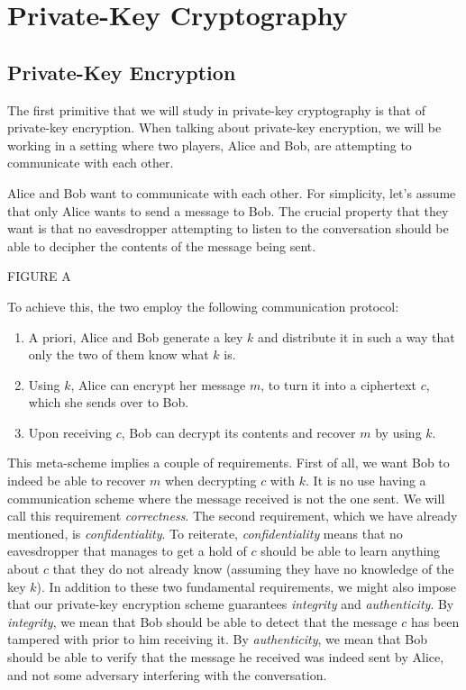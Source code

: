 \chapter{Private-Key Cryptography}
\newcommand{\gen}{\mathsf{Gen}}
\section{Private-Key Encryption}
The first primitive that we will study in private-key cryptography is that of private-key encryption.
When talking about private-key encryption, we will be working in a setting where two players, Alice and Bob, are attempting to communicate with each other.

Alice and Bob want to communicate with each other.
For simplicity, let's assume that only Alice wants to send a message to Bob.
The crucial property that they want is that no eavesdropper attempting to listen to the conversation should be able to decipher the contents of the message being sent.

FIGURE A

To achieve this, the two employ the following communication protocol:
\begin{enumerate}
    \item A priori, Alice and Bob generate a key $k$ and distribute it in such a way that only the two of them know what $k$ is.
    \item Using $k$, Alice can encrypt her message $m$, to turn it into a ciphertext $c$, which she sends over to Bob. 
    \item Upon receiving $c$, Bob can decrypt its contents and recover $m$ by using $k$.
\end{enumerate}
This meta-scheme implies a couple of requirements.
First of all, we want Bob to indeed be able to recover $m$ when decrypting $c$ with $k$.
It is no use having a communication scheme where the message received is not the one sent. We will call this requirement \textit{correctness}.
The second requirement, which we have already mentioned, is \textit{confidentiality}.
To reiterate, \textit{confidentiality} means that no eavesdropper that manages to get a hold of $c$ should be able to learn anything about $c$ that they do not already know (assuming they have no knowledge of the key $k$).
In addition to these two fundamental requirements, we might also impose that our private-key encryption scheme guarantees \textit{integrity} and \textit{authenticity}.
By \textit{integrity}, we mean that Bob should be able to detect that the message $c$ has been tampered with prior to him receiving it.
By \textit{authenticity}, we mean that Bob should be able to verify that the message he received was indeed sent by Alice, and not some adversary interfering with the conversation.

